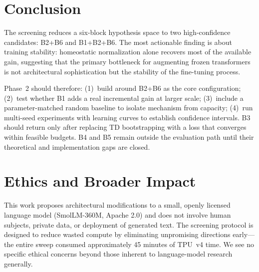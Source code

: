 \documentclass[11pt]{article}
\begin{document}
\section{Conclusion}

The screening reduces a six-block hypothesis space to two high-confidence
candidates: B2+B6 and B1+B2+B6.
The most actionable finding is about training stability: homeostatic
normalization alone recovers most of the available gain, suggesting that the
primary bottleneck for augmenting frozen transformers is not architectural
sophistication but the stability of the fine-tuning process.

Phase~2 should therefore:
(1)~build around B2+B6 as the core configuration;
(2)~test whether B1 adds a real incremental gain at larger scale;
(3)~include a parameter-matched random baseline to isolate mechanism from
capacity;
(4)~run multi-seed experiments with learning curves to establish confidence
intervals.
B3 should return only after replacing TD bootstrapping with a loss that
converges within feasible budgets.
B4 and B5 remain outside the evaluation path until their theoretical and
implementation gaps are closed.

\section*{Ethics and Broader Impact}

This work proposes architectural modifications to a small, openly licensed
language model (SmolLM-360M, Apache 2.0) and does not involve human subjects,
private data, or deployment of generated text.
The screening protocol is designed to reduce wasted compute by eliminating
unpromising directions early---the entire sweep consumed approximately 45
minutes of TPU~v4 time.
We see no specific ethical concerns beyond those inherent to language-model
research generally.



\end{document}
